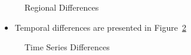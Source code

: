 \documentclass[
  11pt,
]{article}
\providecommand{\tightlist}{%
  \setlength{\itemsep}{0pt}\setlength{\parskip}{0pt}}\usepackage{longtable,booktabs,array}
\begin{document}
\begin{figure}[H]


\caption{\label{fig-regional-diff}Regional Differences}

\end{figure}%

\begin{itemize}
\tightlist
\item
  Temporal differences are presented in Figure~\ref{fig-time-diff}
\end{itemize}

\begin{figure}[H]


\caption{\label{fig-time-diff}Time Series Differences}

\end{figure}%
\end{document}
